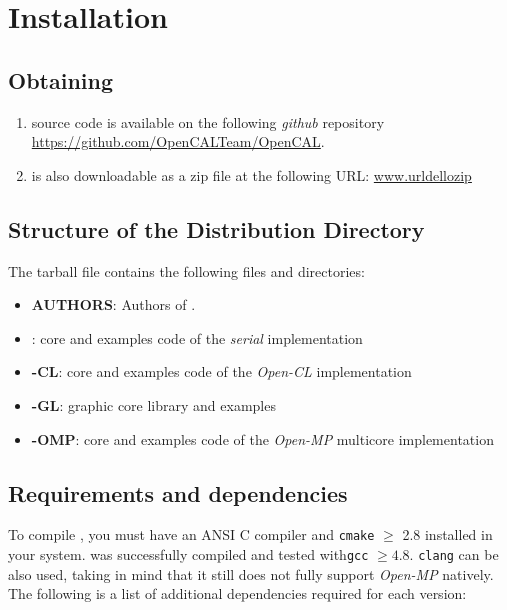 \chapter{Installation} 
\label{ch:installation}



\section{Obtaining \texttt{\ocal}}

\begin{enumerate}
\item  \texttt{\ocal} source code is available on the following \emph{github} repository \url{https://github.com/OpenCALTeam/OpenCAL}. 

\item \texttt{\ocal} is also downloadable as a zip file at the following URL: \url{www.urldellozip}
\end{enumerate}




\section{Structure of the Distribution Directory}

The tarball file contains the following files and directories:

\begin{itemize}

	
    \item \textbf{AUTHORS}: Authors of \texttt{\ocal}.
	\item \textbf{\ocal}: core and examples code of the \emph{serial} implementation  
	\item \textbf{\ocal-CL}:  core and examples code of the \emph{Open-CL} implementation  
	\item \textbf{\ocal-GL}:  \texttt{\ocal} graphic core library and examples   
	\item \textbf{\ocal-OMP}:  core and examples code of the \emph{Open-MP}  multicore implementation  

\end{itemize}


\section{Requirements and dependencies}

To compile \texttt{\ocal}, you must have an ANSI C compiler and \texttt{cmake} $\geq$ 2.8 installed in your system.
\ocal was successfully compiled and tested with\texttt{gcc} $\geq 4.8$. \texttt{clang} can be also used, taking in mind that it still does not fully support \emph{Open-MP} natively.
The following is a list of additional dependencies required for each \ocal version:

